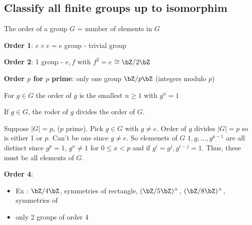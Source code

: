 \subsection{Classify all finite groups up to isomorphim}

\begin{definition}
    The order of a group $G$ = number of elements in $G$
\end{definition}

\noindent
\textbf{Order 1}: $e \times e = e$  group - trivial group

\noindent 
\textbf{Order 2}: 1 group - $e,f$ with $f^2=e$ $\cong \bZ/2\bZ$ 

\noindent
\textbf{Order $p$ for $p$ prime}: only one group $\bZ/p\bZ$ (integers modulo $p$)

\begin{definition}
    For $g \in G$ the order of $g$ is the smallest $ n \ge 1$ with $g^n=1$
\end{definition}

\begin{theorem}
    If $g \in G$, the roder of $g$ divides the order of $G$. 
\end{theorem}

\begin{example}
    Suppose $|G|=p$, ($p$ prime). Pick $g \in G$ with $g \neq e$. Order of $g$ divides $|G|=p$ so is either 1 or $p$. Can't be one since $g \neq e$. So elemenets of $G$ $1, g, \ldots, g^{p-1}$ are all distinct since $g^p=1$, $g^x \neq 1$ for $0 \le x < p$ and if $g^i = g^j, g^{i-j}=1$. Thus, these must be all elements of $G$. 
\end{example}

\noindent
\textbf{Order 4}: 
\begin{itemize}
    \item Ex : $\bZ/4\bZ$, symmetries of rectangle, $(\bZ/5\bZ)^{\times}$, $(\bZ/8\bZ)^{\times}$, symmetries of 
    \item only 2 groups of order 4
\end{itemize}